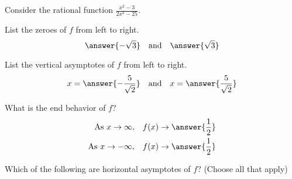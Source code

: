 \documentclass{ximera}
\author{Bobby Ramsey}
\begin{document}
Consider the rational function $\displaystyle \frac{x^2-3}{2x^2-25}$.

\begin{exercise}
	List the zeroes of $f$ from left to right.
	\[ \answer{-\sqrt{3}} \quad \text{and} \quad \answer{\sqrt{3}} \]
\end{exercise}

\begin{exercise}
	List the vertical asymptotes of $f$ from left to right.	
	\[ x = \answer{-\frac{5}{\sqrt{2}}} \quad \text{and} \quad x=\answer{\frac{5}{\sqrt{2}}} \]
\end{exercise}	
	
\begin{exercise}
	What is the end behavior of $f$?
	\begin{align*}
		\text{As} \,\, x \to \infty, &\quad f(x) \to \answer{\frac{1}{2}}\\
		\text{As} \,\, x \to -\infty, &\quad f(x) \to \answer{\frac{1}{2}}\\
	\end{align*}	
\end{exercise}	
	
\begin{exercise}
	Which of the following are horizontal asymptotes of $f$? (Choose all that apply)
	\begin{selectAll}
	\end{selectAll}	
\end{exercise}	
	
\end{document}
